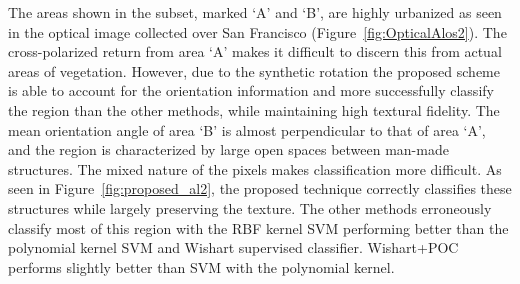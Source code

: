 The areas shown in the subset, marked `A' and `B', are highly urbanized as seen in the optical image collected over San Francisco (Figure~\ref{fig:OpticalAlos2}).
The cross-polarized return from area `A' makes it difficult to discern this from actual areas of vegetation. However, due to the synthetic rotation the proposed scheme is able to account for the orientation information and more successfully classify the region than the other methods, while maintaining high textural fidelity. 
The mean orientation angle of area `B' is almost perpendicular to that of area `A', and the region is characterized by large open spaces between man-made structures. The mixed nature of the pixels makes classification more difficult. As seen in Figure~\ref{fig:proposed_al2}, the proposed technique correctly classifies these structures while largely preserving the texture. The other methods erroneously classify most of this region with the RBF kernel SVM performing  better than the polynomial kernel SVM and Wishart supervised classifier. Wishart+POC performs slightly better than SVM with the polynomial kernel.